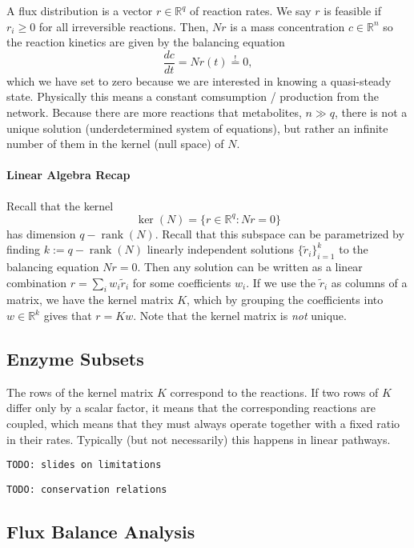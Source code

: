 \documentclass[a4paper]{article}
\newcommand{\todo}[1]{\texttt{TODO: #1}}
\DeclareMathOperator{\rank}{rank}
\theoremstyle{plain}
\theoremstyle{definition}
\theoremstyle{remark}
\begin{document}
A flux distribution is a vector $r \in \mathbb{R}^q$ of reaction rates. We say
$r$ is feasible if $r_i \geq 0$ for all irreversible reactions. Then, $Nr$ is
a mass concentration $c \in \mathbb{R}^n$ so the reaction kinetics are given
by the balancing equation
\[
  \frac{dc}{dt} = N r(t) \stackrel{!}{=} 0,
\]
which we have set to zero because we are interested in knowing a quasi-steady
state. Physically this means a constant comsumption / production from the
network. Because there are more reactions that metabolites, $n \gg q$, there
is not a unique solution (underdetermined system of equations), but rather an
infinite number of them in the kernel (null space) of $N$. 

\paragraph{Linear Algebra Recap} Recall that the kernel
\[
  \ker(N) = \{ r \in \mathbb{R}^q : Nr = 0 \}
\]
has dimension $q - \rank(N)$. Recall that this subspace can be parametrized by
finding $k := q - \rank(N)$ linearly independent solutions
$\{\tilde{r}_i\}_{i=1}^k$ to the balancing equation $Nr = 0$. Then any
solution can be written as a linear combination $r = \sum_i w_i \tilde{r}_i$
for some coefficients $w_i$. If we use the $\tilde{r}_i$ as columns of a
matrix, we have the kernel matrix $K$, which by grouping the coefficients into
$w \in \mathbb{R}^k$ gives that $r = Kw$. Note that the kernel matrix is
\emph{not} unique.

\subsection{Enzyme Subsets}

The rows of the kernel matrix $K$ correspond to the reactions. If two rows of
$K$ differ only by a scalar factor, it means that the corresponding reactions
are coupled, which means that they must always operate together with a fixed
ratio in their rates. Typically (but not necessarily) this happens in linear
pathways.

\todo{slides on limitations}

\todo{conservation relations}

\subsection{Flux Balance Analysis}
\end{document}
